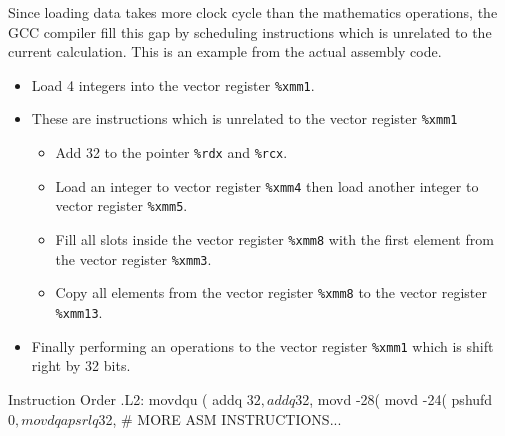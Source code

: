 \documentclass[12pt, a4paper]{article}
\begin{document}
                Since loading data takes more clock cycle than the mathematics operations,
                the GCC compiler fill this gap by scheduling instructions which is unrelated
                to the current calculation. This is an example from the actual assembly code.
                \begin{itemize}
                    \item Load 4 integers into the vector register \texttt{\%xmm1}.
                    \item These are instructions which is unrelated to the vector register \texttt{\%xmm1}
                    \begin{itemize}
                        \item Add 32 to the pointer \texttt{\%rdx} and \texttt{\%rcx}.
                        \item Load an integer to vector register \texttt{\%xmm4} then
                        load another integer to vector register \texttt{\%xmm5}.
                        \item Fill all slots inside the vector register \texttt{\%xmm8} with
                        the first element from the vector register \texttt{\%xmm3}.
                        \item Copy all elements from the vector register \texttt{\%xmm8} to
                        the vector register \texttt{\%xmm13}.
                    \end{itemize}
                    \item Finally performing an operations to the vector register \texttt{\%xmm1}
                    which is shift right by 32 bits.
                \end{itemize}
                \begin{codeblock}[minted language=asm]{Instruction Order}
                    .L2:
                        movdqu  (%
                        addq    $32, %
                        addq    $32, %
                        movd    -28(%
                        movd    -24(%
                        pshufd  $0, %
                        movdqa  %
                        psrlq   $32, %
                        # MORE ASM INSTRUCTIONS...
                \end{codeblock}

    \pagebreak
\end{document}
